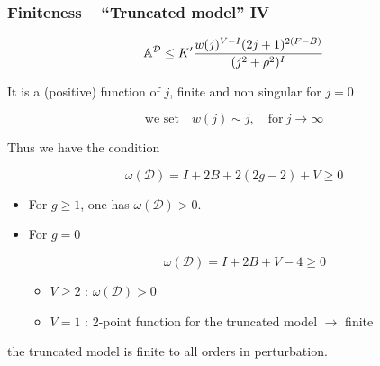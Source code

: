 \documentclass[9pt]{beamer}
\begin{document}
\begin{frame}

\frametitle{Finiteness -- ``Truncated model'' IV}

\begin{exampleblock}{}
\vspace*{-3pt}
\begin{equation*}
{\mathbb{A}}^{\cal{D}} \leq K^\prime\frac{w(j)^{V-I}(2j+1)^{2(F-B)}}{(j^2+\rho^2)^I}
\end{equation*}
\end{exampleblock}

It is a (positive) function of $j$, finite and non singular for $j=0$ 

\begin{equation*}
\mbox{we set} \quad w(j)\sim j, \quad \mbox{for} \ j\to\infty
\end{equation*}

Thus we have the condition

\begin{equation*}
\omega(\mathcal{D})=I+2B+2(2g-2)+V\ge0
\end{equation*}

\begin{itemize}

\item For $g\ge1$, one has $\omega(\mathcal{D})>0$. 

\item For $g=0$

\begin{equation*}
\omega(\mathcal{D})= I+2B+V-4\ge0 
\end{equation*}

\begin{itemize}
\item $V\geq2$ : $\omega(\mathcal{D})>0$ 

\item $V=1$ : 2-point function for the truncated model $\to$ finite

\end{itemize}

\end{itemize}

\begin{block}{}
\vspace*{-14pt}
\begin{center}
the truncated model is finite to all orders in perturbation. 
\end{center}
\vspace*{-9pt}
\end{block}


\end{frame}
\end{document}

